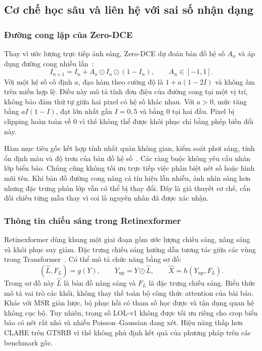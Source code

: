\subsection{Cơ chế học sâu và liên hệ với sai số nhận dạng}
\subsubsection{Đường cong lặp của Zero-DCE}
Thay vì ước lượng trực tiếp ảnh sáng, Zero-DCE dự đoán bản đồ hệ số $A_n$ và áp dụng đường cong nhiều lần~\cite{zerodce}:
\begin{equation}
I_{n+1}=I_n+A_n\odot I_n\odot(1-I_n),\qquad A_n\in[-1,1].
\end{equation}
Với một hệ số cố định $a$, đạo hàm theo cường độ là $1+a(1-2I)$ và không âm trên miền hợp lệ. Điều này mô tả tính đơn điệu của đường cong tại một vị trí, không bảo đảm thứ tự giữa hai pixel có hệ số khác nhau. Với $a>0$, mức tăng bằng $aI(1-I)$, đạt lớn nhất gần $I=0,5$ và bằng 0 tại hai đầu. Pixel bị clipping hoàn toàn về 0 vì thế không thể được khôi phục chỉ bằng phép biến đổi này.

Hàm mục tiêu gốc kết hợp tính nhất quán không gian, kiểm soát phơi sáng, tính ổn định màu và độ trơn của bản đồ hệ số~\cite{zerodce}. Các ràng buộc không yêu cầu nhãn lớp biển báo. Chúng cũng không tối ưu trực tiếp việc phân biệt nét số hoặc hình mũi tên. Khi bản đồ đường cong nâng cả tín hiệu lẫn nhiễu, ảnh nhìn sáng hơn nhưng đặc trưng phân lớp vẫn có thể bị thay đổi. Đây là giả thuyết cơ chế, cần đối chiếu từng mẫu thay vì coi là nguyên nhân đã được xác nhận.

\subsubsection{Thông tin chiếu sáng trong Retinexformer}
Retinexformer dùng khung một giai đoạn gồm ước lượng chiếu sáng, nâng sáng và khôi phục suy giảm. Đặc trưng chiếu sáng hướng dẫn tương tác giữa các vùng trong Transformer~\cite{retinexformer}. Có thể mô tả chức năng bằng sơ đồ:
\begin{equation}
(\widehat{L},F_L)=g(Y),\qquad Y_{\mathrm{up}}=Y\odot\widehat{L},\qquad
\widehat{X}=h(Y_{\mathrm{up}},F_L).
\end{equation}
Trong sơ đồ này $\widehat{L}$ là bản đồ nâng sáng và $F_L$ là đặc trưng chiếu sáng. Biểu thức mô tả vai trò các khối, không thay thế toàn bộ công thức attention của bài báo. Khác với MSR giản lược, bộ phục hồi có tham số học được và tận dụng quan hệ không cục bộ. Tuy nhiên, trọng số LOL-v1 không được tối ưu riêng cho crop biển báo có nét rất nhỏ và nhiễu Poisson--Gaussian đang xét. Hiệu năng thấp hơn CLAHE trên GTSRB vì thế không phủ định kết quả của phương pháp trên các benchmark gốc.

